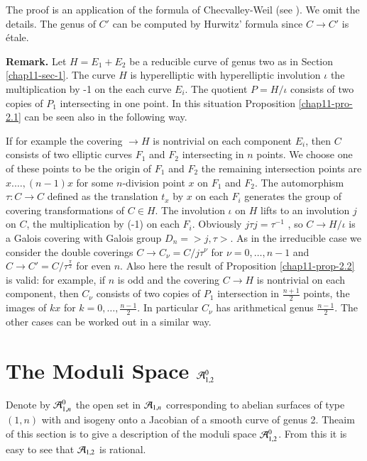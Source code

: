 The proof is an application of the formula of Checvalley-Weil (see \cite{chap11-keyC-W}). We omit the details. The genus of $C'$ can be computed by Hurwitz' formula since $C\rightarrow C'$ is \'etale.

\medskip
\noindent
{\bfseries {} Remark.\label{chap11-remark-2.3}} Let $ H =E_{1}+ E_{2}$ be a reducible curve of genus two as in Section \ref{chap11-sec-1}. The curve $H$ is hyperelliptic with hyperelliptic involution $\iota$ the multiplication by -1 on the each curve $E_{i}$. The quotient $P=H /\iota$ consists of two copies of $P_{1}$ intersecting in one point. In this situation Proposition \ref{chap11-pro-2.1} can be seen also in the following way.

If for example the covering $\rightarrow H$ is nontrivial on each component $E_{i}$, then $C$ consists of two elliptic curves $F_{1}$ and $F_{2}$  intersecting in $n$ points. We choose one of these points to be the origin of $F_{1}$ and $F_{2}$ the remaining intersection points are $x. \ldots, (n-1)x$ for some $n$-division point $x$ on $F_{1}$ and $F_{2}$. The automorphism $\tau : C\rightarrow C$ defined as the translation $t_{x}$ by $x$ on each $F_{i}$ generates the group of covering transformations of $C\in H$. The involution $\iota$ on $H$ lifts to an involution $j$ on $C$, the multiplication by (-1) on each $F_{i}$. Obviously $j\tau j= \tau^{-1}$ , so $C \rightarrow H/\iota$ is a Galois covering with Galois group
$D_{n} = >j,\tau >$. As in the irreducible case we consider the double coverings $C\rightarrow C_{\nu}=C/j\tau^{\nu}$ for $\nu = 0,\ldots, n-1$ and $C \rightarrow C' =C/\tau^{\frac{\pi}{2}}$ for even $n$. Also here the result of Proposition \ref{chap11-prop-2.2} is valid: for example, if $n$ is odd and the covering $C \rightarrow H$ is nontrivial on each component, then $C_{\nu}$ consists of two copies of $P_{1}$  intersection in $\frac{n+1}{2}$ points, the images of $kx$ for $k = 0 ,\ldots, \frac{n-1}{2}$. In particular $C_{\nu}$ has arithmetical genus $\frac{n-1}{2}$. The other cases can be worked out in a similar way.

\section{The Moduli Space \protect\boldmath$\mathcal{A}^{0}_{1,2}$}\label{chap11-sec-3}

Denote by $\mathcal{A}^{0}_{1,n}$ the open set in $\mathcal{A}_{1,n}$ corresponding to abelian surfaces of type $(1,n)$ with and isogeny onto a Jacobian of a smooth curve of genus 2. The\pageoriginale aim of this section is to give a description of the moduli space $\mathcal{A}^{0}_{1,2}$. From this it is easy to see that $\mathcal{A}_{1,2}$ is rational.

